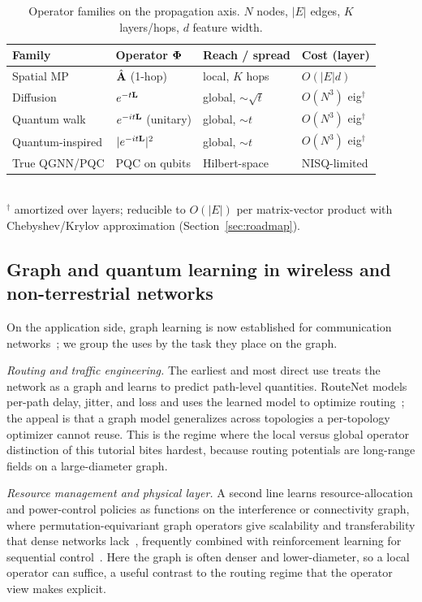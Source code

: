 \begin{table}[t]
\centering
\caption{Operator families on the propagation axis. $N$ nodes, $|E|$ edges,
$K$ layers/hops, $d$ feature width.}
\label{tab:opfamilies}
\renewcommand{\arraystretch}{1.25}
\footnotesize
\begin{tabular}{@{}p{}p{}p{}p{}@{}}
\toprule
Family & Operator $\boldsymbol{\Phi}$ & Reach / spread & Cost (layer) \\
\midrule
Spatial MP & $\hat{\mathbf{A}}$ (1-hop) & local, $K$ hops & $O(|E|d)$ \\
Diffusion & $e^{-t\mathbf{L}}$ & global, $\sim\!\sqrt{t}$ & $O(N^3)$ eig$^\dagger$ \\
Quantum walk & $e^{-it\mathbf{L}}$ (unitary) & global, $\sim\! t$ & $O(N^3)$ eig$^\dagger$ \\
Quantum-inspired & $|e^{-it\mathbf{L}}|^2$ & global, $\sim\! t$ & $O(N^3)$ eig$^\dagger$ \\
True QGNN/PQC & PQC on qubits & Hilbert-space & NISQ-limited \\
\bottomrule
\end{tabular}
\\[2pt]
{\footnotesize $^\dagger$ amortized over layers; reducible to $O(|E|)$ per
matrix-vector product with Chebyshev/Krylov approximation (Section~\ref{sec:roadmap}).}
\end{table}

\subsection{Graph and quantum learning in wireless and non-terrestrial networks}
On the application side, graph learning is now established for communication
networks~\cite{suarezvarela2023gnn,jiang2022graph}; we group the uses by the task they
place on the graph.

\emph{Routing and traffic engineering.} The earliest and most direct use treats the
network as a graph and learns to predict path-level quantities. RouteNet models per-path
delay, jitter, and loss and uses the learned model to optimize
routing~\cite{rusek2020routenet}; the appeal is that a graph model generalizes across
topologies a per-topology optimizer cannot reuse. This is the regime where the local
versus global operator distinction of this tutorial bites hardest, because routing
potentials are long-range fields on a large-diameter graph.

\emph{Resource management and physical layer.} A second line learns resource-allocation
and power-control policies as functions on the interference or connectivity graph, where
permutation-equivariant graph operators give scalability and transferability that dense
networks lack~\cite{shen2021gnnradio,eisen2020optimal}, frequently combined with
reinforcement learning for sequential control~\cite{mao2016resource}. Here the graph is
often denser and lower-diameter, so a local operator can suffice, a useful contrast to
the routing regime that the operator view makes explicit.

